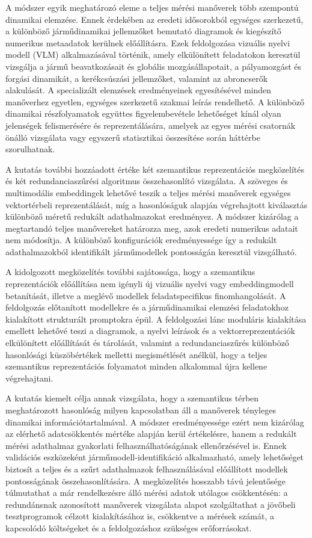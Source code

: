 \documentclass[12pt,a4paper,onehalfspacing, oneside]{book} %
\begin{document}
A módszer egyik meghatározó eleme a teljes mérési manőverek több szempontú dinamikai elemzése. Ennek érdekében az eredeti idősorokból egységes szerkezetű, a különböző járműdinamikai jellemzőket bemutató diagramok és kiegészítő numerikus metaadatok kerülnek előállításra. Ezek feldolgozása vizuális nyelvi modell (VLM) alkalmazásával történik, amely elkülönített feladatokon keresztül vizsgálja a jármű beavatkozásait és globális mozgásállapotait, a pályamozgást és forgási dinamikát, a kerékcsúszási jellemzőket, valamint az abroncserők alakulását. A specializált elemzések eredményeinek egyesítésével minden manőverhez egyetlen, egységes szerkezetű szakmai leírás rendelhető. A különböző dinamikai részfolyamatok együttes figyelembevétele lehetőséget kínál olyan jelenségek felismerésére és reprezentálására, amelyek az egyes mérési csatornák önálló vizsgálata vagy egyszerű statisztikai összesítése során háttérbe szorulhatnak.

A kutatás további hozzáadott értéke két szemantikus reprezentációs megközelítés és két redundanciaszűrési algoritmus összehasonlító vizsgálata. A szöveges és multimodális embeddingek lehetővé teszik a teljes mérési manőverek egységes vektortérbeli reprezentálását, míg a hasonlóságuk alapján végrehajtott kiválasztás különböző méretű redukált adathalmazokat eredményez. A módszer kizárólag a megtartandó teljes manővereket határozza meg, azok eredeti numerikus adatait nem módosítja. A különböző konfigurációk eredményessége így a redukált adathalmazokból identifikált járműmodellek pontosságán keresztül vizsgálható.

A kidolgozott megközelítés további sajátossága, hogy a szemantikus reprezentációk előállítása nem igényli új vizuális nyelvi vagy embeddingmodell betanítását, illetve a meglévő modellek feladatspecifikus finomhangolását. A feldolgozás előtanított modellekre és a járműdinamikai elemzési feladatokhoz kialakított strukturált promptokra épül. A feldolgozási lánc moduláris kialakítása emellett lehetővé teszi a diagramok, a nyelvi leírások és a vektorreprezentációk elkülönített előállítását és tárolását, valamint a redundanciaszűrés különböző hasonlósági küszöbértékek melletti megismétlését anélkül, hogy a teljes szemantikus reprezentációs folyamatot minden alkalommal újra kellene végrehajtani.

A kutatás kiemelt célja annak vizsgálata, hogy a szemantikus térben meghatározott hasonlóság milyen kapcsolatban áll a manőverek tényleges dinamikai információtartalmával. A módszer eredményessége ezért nem kizárólag az elérhető adatcsökkentés mértéke alapján kerül értékelésre, hanem a redukált mérési adathalmaz gyakorlati felhasználhatóságának ellenőrzésével is. Ennek validációs eszközeként járműmodell-identifikáció alkalmazható, amely lehetőséget biztosít a teljes és a szűrt adathalmazok felhasználásával előállított modellek pontosságának összehasonlítására. A megközelítés hosszabb távú jelentősége túlmutathat a már rendelkezésre álló mérési adatok utólagos csökkentésén: a redundánsnak azonosított manőverek vizsgálata alapot szolgáltathat a jövőbeli tesztprogramok célzott kialakításához is, csökkentve a mérések számát, a kapcsolódó költségeket és a feldolgozáshoz szükséges erőforrásokat.
\end{document}
